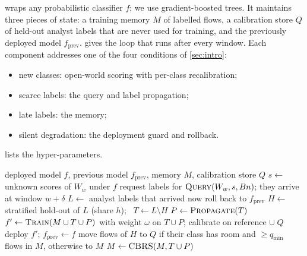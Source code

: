 \section{\nova{}}
\label{sec:method}

\nova{} wraps any probabilistic classifier $f$; we use gradient-boosted trees. It maintains three pieces of
state: a training memory $M$ of labelled flows, a calibration store $Q$ of held-out analyst labels that are never
used for training, and the previously deployed model $f_{\text{prev}}$.  gives the loop that runs
after every window. Each component addresses one of the four conditions of \cref{sec:intro}:
\begin{itemize}
  \item new classes: open-world scoring with per-class recalibration;
  \item scarce labels: the query and label propagation;
  \item late labels: the memory;
  \item silent degradation: the deployment guard and rollback.
\end{itemize}
 lists the hyper-parameters.

\begin{algorithm}[t]
\caption{\nova{} after window $W_w$ has been predicted}
\label{alg:nova}
\begin{algorithmic}[1]
\Require deployed model $f$, previous model $f_{\text{prev}}$, memory $M$, calibration store $Q$
\State $s \gets$ unknown scores of $W_w$ under $f$ 
\State request labels for $\textsc{Query}(W_w, s, Bn)$; they arrive at window $w{+}\delta$ 
\State $L \gets$ analyst labels that arrived now
   \State roll back to $f_{\text{prev}}$ 
\EndIf
\State $H \gets$ stratified hold-out of $L$ (share $h$); \ $T \gets L\setminus H$
\State $P \gets \textsc{Propagate}(T)$ 
\State $f' \gets \textsc{Train}(M \cup T \cup P)$ with weight $\omega$ on $T \cup P$; calibrate on reference $\cup\; Q$
   \State deploy $f'$; $f_{\text{prev}} \gets f$
\EndIf
\State move flows of $H$ to $Q$ if their class has room and $\ge q_{\min}$ flows in $M$, otherwise to $M$
\State $M \gets \textsc{CBRS}(M, T \cup P)$ 
\end{algorithmic}
\end{algorithm}

